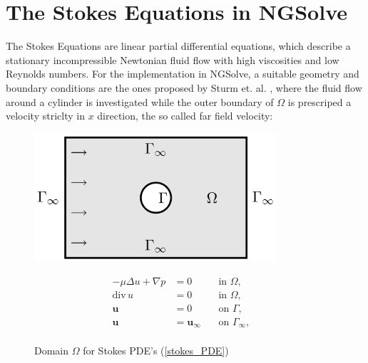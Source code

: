 \section{The Stokes Equations in NGSolve}

The Stokes Equations are linear partial differential equations, which describe a stationary incompressible Newtonian fluid flow
with high viscosities and low Reynolds numbers. For the implementation in NGSolve, a suitable geometry and boundary conditions are 
the ones proposed by Sturm et. al. \cite{nearly_conformal_paper}, where the fluid flow around a cylinder is investigated while the
outer boundary of $\Omega$ is prescriped a velocity striclty in $x$ direction, the so called far field velocity:

\null

\begin{figure}[!htbp]
\begin{minipage}{.5\textwidth}
    \centering
    \includegraphics[width=0.8\textwidth]{figures/domain_graphic_sturm.PNG}
    \caption{Domain $\Omega$ for Stokes PDE's (\ref{stokes_PDE}) \cite{nearly_conformal_paper}}
\end{minipage}
\begin{minipage}{.5\textwidth}
    \begin{equation}\label{stokes_PDE}
        \begin{aligned}
            -\mu \Delta u + \nabla p &=0& \, &\text{in } \Omega,& \\
            \mathrm{div} \, u &=0& \, &\text{in } \Omega,& \\
            \mathbf{u} &=0& \, &\text{on } \Gamma,& \\
            \mathbf{u} &=\mathbf{u}_{\infty}& \, &\text{on } \Gamma_{\infty},& \\
        \end{aligned}
    \end{equation}
\end{minipage}
\end{figure}


